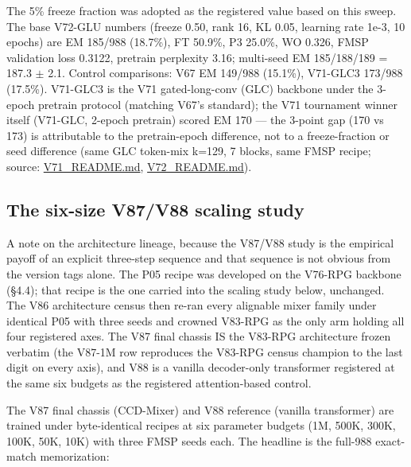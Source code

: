 \documentclass[11pt]{article}
\begin{document}
The 5\% freeze fraction was adopted as the registered value based on this sweep. The base V72-GLU numbers (freeze 0.50, rank 16, KL 0.05, learning rate 1e-3, 10 epochs) are EM 185/988 (18.7\%), FT 50.9\%, P3 25.0\%, WO 0.326, FMSP validation loss 0.3122, pretrain perplexity 3.16; multi-seed EM 185/188/189 = 187.3 $\pm$ 2.1. Control comparisons: V67 EM 149/988 (15.1\%), V71-GLC3 173/988 (17.5\%). V71-GLC3 is the V71 gated-long-conv (GLC) backbone under the 3-epoch pretrain protocol (matching V67's standard); the V71 tournament winner itself (V71-GLC, 2-epoch pretrain) scored EM 170 --- the 3-point gap (170 vs 173) is attributable to the pretrain-epoch difference, not to a freeze-fraction or seed difference (same GLC token-mix k=129, 7 blocks, same FMSP recipe; source: \href{https://github.com/llaa33219/MicroMixer-4/blob/4bb630413dfa58ef3141291e121ab8c006d03235/V71_README.md}{V71\_README.md}, \href{https://github.com/llaa33219/MicroMixer-4/blob/4bb630413dfa58ef3141291e121ab8c006d03235/V72_README.md}{V72\_README.md}).

\subsection{The six-size V87/V88 scaling study}

A note on the architecture lineage, because the V87/V88 study is the empirical payoff of an explicit three-step sequence and that sequence is not obvious from the version tags alone. The P05 recipe was developed on the V76-RPG backbone (\S4.4); that recipe is the one carried into the scaling study below, unchanged. The V86 architecture census then re-ran every alignable mixer family under identical P05 with three seeds and crowned V83-RPG as the only arm holding all four registered axes. The V87 final chassis IS the V83-RPG architecture frozen verbatim (the V87-1M row reproduces the V83-RPG census champion to the last digit on every axis), and V88 is a vanilla decoder-only transformer registered at the same six budgets as the registered attention-based control.

The V87 final chassis (CCD-Mixer) and V88 reference (vanilla transformer) are trained under byte-identical recipes at six parameter budgets (1M, 500K, 300K, 100K, 50K, 10K) with three FMSP seeds each. The headline is the full-988 exact-match memorization:
\end{document}
